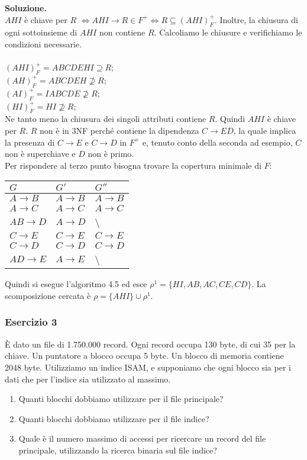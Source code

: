  \noindent\textbf{\fontsize{14pt}{1em}Soluzione.}\\
 $AHI$ è chiave per $R$ $\Leftrightarrow AHI \rightarrow R\in F^+ \Leftrightarrow R \subseteq (AHI)^+_F$. Inoltre, la chiusura
 di ogni sottoinsieme di $AHI$ non contiene $R$.
 Calcoliamo le chiusure e verifichiamo le condizioni necessarie.\\\\
 $(AHI)^+_F = ABCDEHI \supseteq R$;\\
 $(AH)^+_F = ABCDEH \not\supseteq R$;\\
 $(AI)^+_F = IABCDE \not\supseteq R$;\\
 $(HI)^+_F = HI \not\supseteq R$;\\
 Ne tanto meno la chiusura dei singoli attributi contiene $R$. Quindi $AHI$ è chiave per $R$. $R$ non è in 3NF perché contiene
 la dipendenza $C\rightarrow ED$, la quale implica la presenza di $C \rightarrow E$ e $C\rightarrow D$ in $F^+$ e, tenuto conto
 della seconda ad esempio, $C$ non è superchiave e $D$ non è primo.\\

Per rispondere al terzo punto bisogna trovare la copertura minimale di $F$:
\begin{center}
 \begin{tabular}{l|l|l}
  $G$ & $G'$ & $G''$\\
  \hline
  $A\rightarrow B$ & $A\rightarrow B$ & $A\rightarrow B$ \\
  $A \rightarrow C$ & $A \rightarrow C$ & $A \rightarrow C$\\
  $AB \rightarrow D$ & $A \rightarrow D$ & \textbackslash \\ 
  $C \rightarrow E$ & $C \rightarrow E$ & $C \rightarrow E$\\
  $C \rightarrow D$ & $C \rightarrow D$ & $C \rightarrow D$\\
  $AD \rightarrow E$ & $A \rightarrow E$ & \textbackslash\\ 
 \end{tabular}
\end{center}
Quindi si esegue l'algoritmo 4.5 ed esce $\rho^1= \{HI, AB, AC, CE, CD\}$. La scomposizione cercata è
$\rho = \{AHI\} \cup \rho^1$.

\subsubsection{Esercizio 3}
\`E dato un file di 1.750.000 record. Ogni record occupa 130 byte, di cui 35 per la chiave. Un puntatore a blocco occupa 5 byte.
Un blocco di memoria contiene 2048 byte. Utilizziamo un indice ISAM, e supponiamo che ogni blocco sia per i dati che per l'indice 
sia utilizzato al massimo. 
\begin{enumerate}
 \item Quanti blocchi dobbiamo utilizzare per il file principale? 
 \item Quanti blocchi dobbiamo utilizzare per il file indice?
 \item Quale è il numero massimo di accessi per ricercare un record del file principale, utilizzando 
 la ricerca binaria sul file indice?
\end{enumerate}

